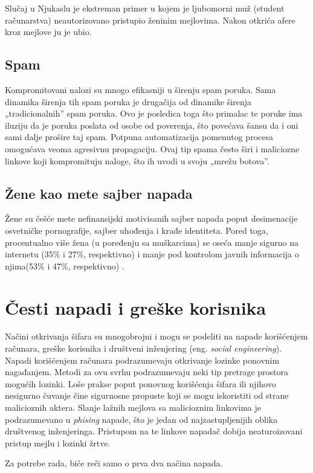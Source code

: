 \documentclass[fleqn, 12pt]{article}
\begin{document}
\indent Slučaj u Njukaslu\cite{newcastle} je ekstreman primer u kojem je ljubomorni muž (student računarstva) neautorizovano pristupio ženinim mejlovima. Nakon otkrića afere kroz mejlove ju je ubio.  

\subsection{Spam}
\indent Kompromitovani nalozi su mnogo efikasniji u širenju spam poruka. Sama dinamika širenja tih spam poruka je drugačija od dinamike širenja „tradicionalnih'' spam poruka. Ovo je posledica toga što primalac te poruke ima iluziju da je poruka poslata od osobe od poverenja, što povećava šansu da i oni sami dalje prošire taj spam. Potpuna automatizacija pomenutog procesa omogućava veoma agresivnu propagaciju\cite{spam}. 
Ovaj tip spama često širi i maliciozne linkove koji kompromituju naloge, što ih uvodi u svoju „mrežu botova''.

\subsection{Žene kao mete sajber napada}
\indent Žene su češće mete nefinansijski motivisanih sajber napada poput desimenacije osvetničke pornografije, sajber uhođenja i krađe identiteta. Pored toga, procentualno više žena (u poređenju sa muškarcima) se oseća manje sigurno na internetu (35\% i 27\%, respektivno) i manje pod kontrolom javnih informacija o njima(53\% i 47\%, respektivno)\cite{zene} \cite{zene2}. 


\newpage
\section{Česti napadi i greške korisnika}
Načini otkrivanja šifara su mnogobrojni i mogu se podeliti na napade korišćenjem računara, greške korisnika i društveni inženjering (eng. \emph{social engineering}). Napadi korišćenjem računara podrazumevaju otkrivanje lozinke ponovnim nagađanjem. Metodi za ovu svrhu podrazumevaju neki tip pretrage prostora mogućih lozinki. Loše prakse poput ponovnog korišćenja šifara ili njihovo nesigurno čuvanje čine sigurnosne propuste koji se mogu iskoristiti od strane malicioznih aktera. Slanje lažnih mejlova sa malicioznim linkovima je podrazumevano u \emph{phising} napade, što je jedan od najzastupljenijih oblika društvenog inženjeringa. Pristupom na te linkove napadač dobija neaturoizovani pristup mejlu i lozinki žrtve.

\indent Za potrebe rada, biće reči samo o prva dva načina napada.
\end{document}
